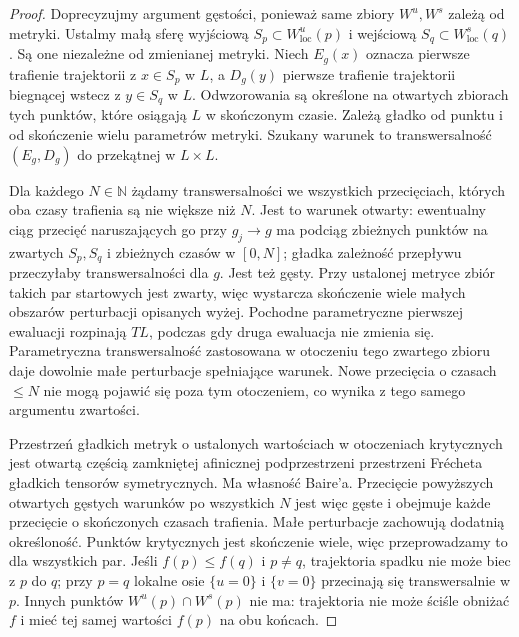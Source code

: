 \begin{proof}
Doprecyzujmy argument gęstości, ponieważ same zbiory
$W^u,W^s$ zależą od metryki. Ustalmy małą sferę
wyjściową $S_p\subset W^u_{\mathrm{loc}}(p)$
i wejściową $S_q\subset W^s_{\mathrm{loc}}(q)$.
Są one niezależne od zmienianej metryki.
Niech $E_g(x)$ oznacza pierwsze trafienie trajektorii
z $x\in S_p$ w $L$, a $D_g(y)$ pierwsze trafienie
trajektorii biegnącej wstecz z $y\in S_q$ w $L$.
Odwzorowania są określone na otwartych zbiorach tych punktów,
które osiągają $L$ w skończonym czasie.
Zależą gładko od punktu i od skończenie wielu
parametrów metryki. Szukany warunek to
transwersalność $(E_g,D_g)$ do przekątnej w $L\times L$.

Dla każdego $N\in\mathbb N$ żądamy transwersalności
we wszystkich przecięciach, których oba czasy
trafienia są nie większe niż $N$.
Jest to warunek otwarty: ewentualny ciąg przecięć
naruszających go przy $g_j\to g$ ma podciąg
zbieżnych punktów na zwartych $S_p,S_q$
i zbieżnych czasów w $[0,N]$; gładka zależność
przepływu przeczyłaby transwersalności dla $g$.
Jest też gęsty. Przy ustalonej metryce zbiór
takich par startowych jest zwarty, więc wystarcza
skończenie wiele małych obszarów perturbacji
opisanych wyżej. Pochodne parametryczne pierwszej
ewaluacji rozpinają $TL$, podczas gdy druga
ewaluacja nie zmienia się. Parametryczna
transwersalność zastosowana w otoczeniu tego
zwartego zbioru daje dowolnie małe perturbacje
spełniające warunek. Nowe przecięcia o czasach
$\leq N$ nie mogą pojawić się poza tym otoczeniem,
co wynika z tego samego argumentu zwartości.

Przestrzeń gładkich metryk o ustalonych wartościach
w otoczeniach krytycznych jest otwartą częścią
zamkniętej afinicznej podprzestrzeni przestrzeni
Fr\'echeta gładkich tensorów symetrycznych.
Ma własność Baire'a. Przecięcie powyższych
otwartych gęstych warunków po wszystkich $N$
jest więc gęste i obejmuje każde przecięcie
o skończonych czasach trafienia.
Małe perturbacje zachowują dodatnią określoność.
Punktów krytycznych jest
skończenie wiele, więc
przeprowadzamy to dla
wszystkich par. Jeśli
$f(p)\leq f(q)$ i $p\ne q$,
trajektoria spadku nie może
biec z $p$ do $q$;
przy $p=q$ lokalne osie
$\{u=0\}$ i $\{v=0\}$
przecinają się transwersalnie
w $p$.
Innych punktów $W^u(p)\cap W^s(p)$ nie ma:
trajektoria nie może ściśle obniżać $f$ i mieć
tej samej wartości $f(p)$ na obu końcach.
\end{proof}

